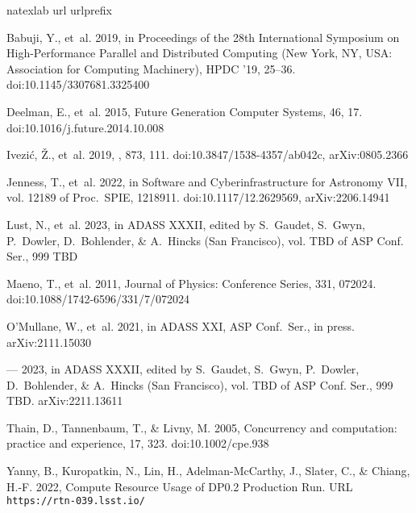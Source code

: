 \documentclass[11pt,twoside]{article}
\begin{document}
\begin{thebibliography}{}
    \expandafter\ifx\csname natexlab\endcsname\relax\def\natexlab#1{#1}\fi
    \expandafter\ifx\csname url\endcsname\relax
      \def\url#1{\texttt{#1}}\fi
    \expandafter\ifx\csname urlprefix\endcsname\relax\def\urlprefix{URL }\fi
    \providecommand{\eprint}[2][]{\url{#2}}

    Babuji, Y., et~al. 2019, in Proceedings of the 28th International Symposium on
      High-Performance Parallel and Distributed Computing (New York, NY, USA:
      Association for Computing Machinery), HPDC '19, 25–36.
      doi:10.1145/3307681.3325400

    Deelman, E., et~al. 2015, Future Generation Computer Systems, 46, 17.
      doi:10.1016/j.future.2014.10.008

    {Ivezi{\'c}}, {\v Z}., et~al. 2019, \apj, 873, 111.
      doi:10.3847/1538-4357/ab042c, arXiv:0805.2366

    {Jenness}, T., et~al. 2022, in Software and Cyberinfrastructure for Astronomy
      VII, vol. 12189 of Proc.\ SPIE, 1218911. doi:10.1117/12.2629569,
      arXiv:2206.14941

    {Lust}, N., et~al. 2023, in ADASS XXXII, edited by S.~{Gaudet}, S.~{Gwyn},
      P.~{Dowler}, D.~{Bohlender}, \& A.~{Hincks} (San Francisco), vol. TBD of ASP
      Conf. Ser., 999 TBD

    Maeno, T., et~al. 2011, Journal of Physics: Conference Series, 331, 072024.
      doi:10.1088/1742-6596/331/7/072024

    {O'Mullane}, W., et~al. 2021, in ADASS XXI, ASP Conf.\ Ser., in press.
      arXiv:2111.15030

    --- 2023, in ADASS XXXII, edited by S.~{Gaudet}, S.~{Gwyn}, P.~{Dowler},
      D.~{Bohlender}, \& A.~{Hincks} (San Francisco), vol. TBD of ASP Conf. Ser.,
      999 TBD. arXiv:2211.13611

    Thain, D., Tannenbaum, T., \& Livny, M. 2005, Concurrency and computation:
      practice and experience, 17, 323. doi:10.1002/cpe.938

    Yanny, B., Kuropatkin, N., Lin, H., Adelman-McCarthy, J., Slater, C., \&
      Chiang, H.-F. 2022, {Compute Resource Usage of DP0.2 Production Run}.
      \urlprefix\url{https://rtn-039.lsst.io/}

    \end{thebibliography}



\end{document}
